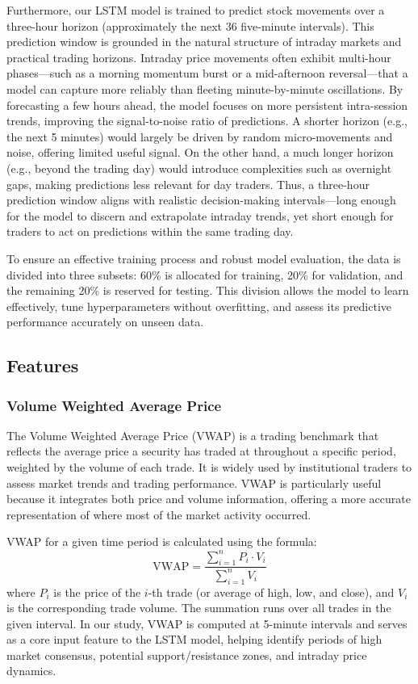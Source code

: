 \documentclass[letterpaper]{article}
\begin{document}
Furthermore, our LSTM model is trained to predict stock movements over a three-hour horizon (approximately the next 36 five-minute intervals). This prediction window is grounded in the natural structure of intraday markets and practical trading horizons. Intraday price movements often exhibit multi-hour phases—such as a morning momentum burst or a mid-afternoon reversal—that a model can capture more reliably than fleeting minute-by-minute oscillations. By forecasting a few hours ahead, the model focuses on more persistent intra-session trends, improving the signal-to-noise ratio of predictions. A shorter horizon (e.g., the next 5 minutes) would largely be driven by random micro-movements and noise, offering limited useful signal. On the other hand, a much longer horizon (e.g., beyond the trading day) would introduce complexities such as overnight gaps, making predictions less relevant for day traders. Thus, a three-hour prediction window aligns with realistic decision-making intervals—long enough for the model to discern and extrapolate intraday trends, yet short enough for traders to act on predictions within the same trading day.

To ensure an effective training process and robust model evaluation, the data is divided into three subsets: 60\% is allocated for training, 20\% for validation, and the remaining 20\% is reserved for testing. This division allows the model to learn effectively, tune hyperparameters without overfitting, and assess its predictive performance accurately on unseen data.

\subsection{Features}

\subsubsection{Volume Weighted Average Price}

The Volume Weighted Average Price (VWAP) is a trading benchmark that reflects the average price a security has traded at throughout a specific period, weighted by the volume of each trade. It is widely used by institutional traders to assess market trends and trading performance. VWAP is particularly useful because it integrates both price and volume information, offering a more accurate representation of where most of the market activity occurred.

VWAP for a given time period is calculated using the formula:
\begin{equation}
\text{VWAP} = \frac{\sum_{i=1}^{n} P_i \cdot V_i}{\sum_{i=1}^{n} V_i}
\end{equation}
where $P_i$ is the price of the $i$-th trade (or average of high, low, and close), and $V_i$ is the corresponding trade volume. The summation runs over all trades in the given interval. In our study, VWAP is computed at 5-minute intervals and serves as a core input feature to the LSTM model, helping identify periods of high market consensus, potential support/resistance zones, and intraday price dynamics.
\end{document}

